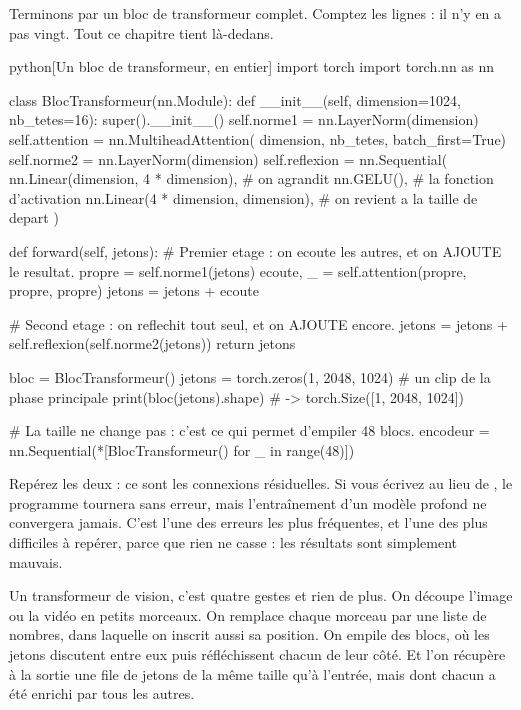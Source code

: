 Terminons par un bloc de transformeur complet. Comptez les lignes : il n'y
en a pas vingt. Tout ce chapitre tient là-dedans.

\begin{code}{python}[Un bloc de transformeur, en entier]
import torch
import torch.nn as nn

class BlocTransformeur(nn.Module):
    def __init__(self, dimension=1024, nb_tetes=16):
        super().__init__()
        self.norme1 = nn.LayerNorm(dimension)
        self.attention = nn.MultiheadAttention(
            dimension, nb_tetes, batch_first=True)
        self.norme2 = nn.LayerNorm(dimension)
        self.reflexion = nn.Sequential(
            nn.Linear(dimension, 4 * dimension),   # on agrandit
            nn.GELU(),                             # la fonction d'activation
            nn.Linear(4 * dimension, dimension),   # on revient a la taille de depart
        )

    def forward(self, jetons):
        # Premier etage : on ecoute les autres, et on AJOUTE le resultat.
        propre = self.norme1(jetons)
        ecoute, _ = self.attention(propre, propre, propre)
        jetons = jetons + ecoute

        # Second etage : on reflechit tout seul, et on AJOUTE encore.
        jetons = jetons + self.reflexion(self.norme2(jetons))
        return jetons

bloc = BlocTransformeur()
jetons = torch.zeros(1, 2048, 1024)     # un clip de la phase principale
print(bloc(jetons).shape)               # -> torch.Size([1, 2048, 1024])

# La taille ne change pas : c'est ce qui permet d'empiler 48 blocs.
encodeur = nn.Sequential(*[BlocTransformeur() for _ in range(48)])
\end{code}

\begin{piege}
Repérez les deux  : ce sont les connexions
résiduelles. Si vous écrivez  au lieu de
, le programme tournera sans erreur,
mais l'entraînement d'un modèle profond ne convergera jamais. C'est l'une
des erreurs les plus fréquentes, et l'une des plus difficiles à repérer,
parce que rien ne casse : les résultats sont simplement mauvais.
\end{piege}

\begin{aretenir}
Un transformeur de vision, c'est quatre gestes et rien de plus. On découpe
l'image ou la vidéo en petits morceaux. On remplace chaque morceau par une
liste de nombres, dans laquelle on inscrit aussi sa position. On empile des
blocs, où les jetons discutent entre eux puis réfléchissent chacun de leur
côté. Et l'on récupère à la sortie une file de jetons de la même taille
qu'à l'entrée, mais dont chacun a été enrichi par tous les autres.
\end{aretenir}

